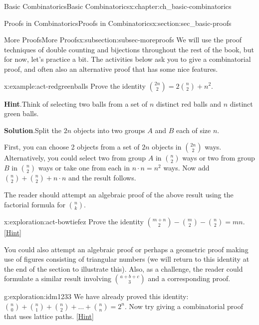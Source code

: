 \documentclass[oneside,10pt,]{book}
\numberwithin{equation}{chapter}
\begin{document}
\begin{chapterptx}{Basic Combinatorics}{}{Basic Combinatorics}{}{}{x:chapter:ch_basic-combinatorics}
\begin{sectionptx}{Proofs in Combinatorics}{}{Proofs in Combinatorics}{}{}{x:section:sec_basic-proofs}
%
\begin{subsectionptx}{More Proofs}{}{More Proofs}{}{}{x:subsection:subsec-moreproofs}
We will use the proof techniques of double counting and bijections throughout the rest of the book, but for now, let's practice a bit.  The activities below ask you to give a combinatorial proof, and often also an alternative proof that has some nice features.%
\begin{example}{}{x:example:act-redgreenballs}%
Prove the identity \(\binom{2n}{2} = 2 \binom{n}{2} + n^{2}\).%
\par\smallskip%
\noindent\textbf{Hint}.\hypertarget{g:hint:idm1192}{}\quad{}Think of selecting two balls from a set of \(n\) distinct red balls and \(n\) distinct green balls.%
\par\smallskip%
\noindent\textbf{Solution}.\hypertarget{g:solution:idm1196}{}\quad{}Split the \(2n\) objects into two groups \(A\) and \(B\) each of size \(n\).%
\par
First, you can choose 2 objects from a set of \(2n\) objects in \(\binom{2n}{2}\) ways. Alternatively, you could select two from group \(A\) in \(\binom{n}{2}\) ways or two from group \(B\) in \(\binom{n}{2}\) ways or take one from each in \(n \cdot n = n^{2}\) ways. Now add \(\binom{n}{2} + \binom{n}{2}+ n \cdot n\) and the result follows.%
\end{example}
The reader should attempt an algebraic proof of the above result using the factorial formula for \(\binom{n}{k}\).%
\begin{exploration}{}{x:exploration:act-bowtiefez}%
Prove the identity \(\binom{m + n}{2} - \binom{m}{2} - \binom{n}{2} = mn\).%
\space\hspace*{0pt}\hfill{\tiny\hyperlink{g:hint:idm1217-back}{[Hint]}}\end{exploration}
You could also attempt an algebraic proof or perhaps a geometric proof making use of figures consisting of triangular numbers (we will return to this identity at the end of the section to illustrate this). Also, as a challenge, the reader could formulate a similar result involving \(\binom{a + b + c}{3}\) and a corresponding proof.%
\begin{exploration}{}{g:exploration:idm1233}%
We have already proved this identity: \(\binom{n}{0} + \binom{n}{1} + \binom{n}{2} + \ldots + \binom{n}{n} = 2^{n}\).  Now try giving a combinatorial proof that uses lattice paths.%
\space\hspace*{0pt}\hfill{\tiny\hyperlink{g:hint:idm1237-back}{[Hint]}}\end{exploration}

\end{subsectionptx}
\end{sectionptx}
\end{chapterptx}
\end{document}
